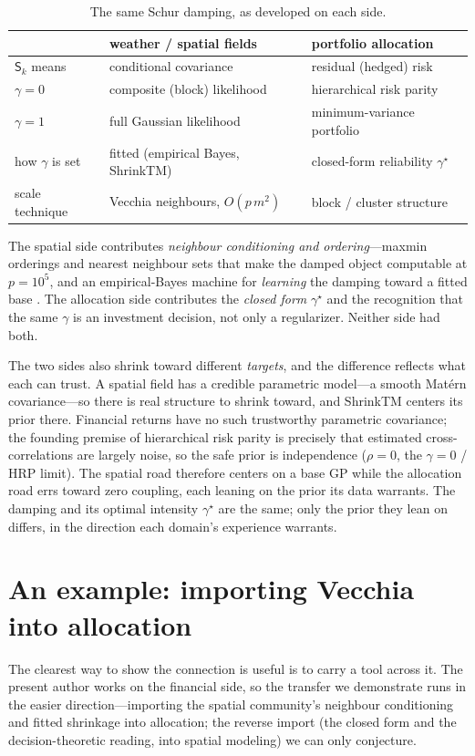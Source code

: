 \documentclass[11pt]{article}
\newcommand{\gstar}{\gamma^\star}
\newcommand{\Sc}{\mathsf S}
\begin{document}
\begin{table}[h]\centering\small
\caption{The same Schur damping, as developed on each side.}\label{tab:sides}
\begin{tabular}{lll}
\toprule
 & weather / spatial fields & portfolio allocation\\
\midrule
$\Sc_k$ means & conditional covariance & residual (hedged) risk\\
$\gamma=0$ & composite (block) likelihood & hierarchical risk parity\\
$\gamma=1$ & full Gaussian likelihood & minimum-variance portfolio\\
how $\gamma$ is set & fitted (empirical Bayes, ShrinkTM) & closed-form reliability $\gstar$\\
scale technique & Vecchia neighbours, $O(p\,m^2)$ & block / cluster structure\\
\bottomrule
\end{tabular}
\end{table}

The spatial side contributes \emph{neighbour conditioning and ordering}---maxmin orderings and nearest
neighbour sets \citep{guinness2018} that make the damped object computable at $p=10^5$, and an
empirical-Bayes machine for \emph{learning} the damping toward a fitted base \citep{chakraborty2025}.
The allocation side contributes the \emph{closed form} $\gstar$ and the recognition that the
same $\gamma$ is an investment decision, not only a regularizer. Neither side had both.

The two sides also shrink toward different \emph{targets}, and the difference reflects what each can
trust. A spatial field has a credible parametric model---a smooth Mat\'ern covariance---so there is
real structure to shrink toward, and ShrinkTM centers its prior there. Financial returns have no such
trustworthy parametric covariance; the founding premise of hierarchical risk parity is precisely that
estimated cross-correlations are largely noise, so the safe prior is independence ($\rho=0$, the
$\gamma=0$ / HRP limit). The spatial road therefore centers on a base GP while the allocation road
errs toward zero coupling, each leaning on the prior its data warrants. The damping and its optimal
intensity $\gstar$ are the same; only the prior they lean on
differs, in the direction each domain's experience warrants.

\section{An example: importing Vecchia into allocation}
The clearest way to show the connection is useful is to carry a tool across it. The present author
works on the financial side, so the transfer we demonstrate runs in the easier direction---importing
the spatial community's neighbour conditioning and fitted shrinkage into allocation; the reverse import
(the closed form and the decision-theoretic reading, into spatial modeling) we can only conjecture.
\end{document}
